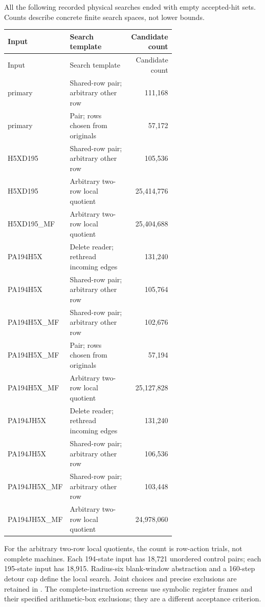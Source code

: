 All the following recorded physical searches ended with empty accepted-hit sets. Counts describe concrete finite search spaces, not lower bounds.
\begingroup\small\setlength{\tabcolsep}{3pt}
\begin{longtable}{>{\raggedright\arraybackslash}p{0.26\linewidth}>{\raggedright\arraybackslash}p{0.39\linewidth}r}
\toprule Input&Search template&Candidate count\\\midrule\endfirsthead
\toprule Input&Search template&Candidate count\\\midrule\endhead
\bottomrule\endfoot
primary&Shared-row pair; arbitrary other row&111,168\\[3pt]
primary&Pair; rows chosen from originals&57,172\\[3pt]
H5XD195&Shared-row pair; arbitrary other row&105,536\\[3pt]
H5XD195&Arbitrary two-row local quotient&25,414,776\\[3pt]
H5XD195\_MF&Arbitrary two-row local quotient&25,404,688\\[3pt]
PA194H5X&Delete reader; rethread incoming edges&131,240\\[3pt]
PA194H5X&Shared-row pair; arbitrary other row&105,764\\[3pt]
PA194H5X\_MF&Shared-row pair; arbitrary other row&102,676\\[3pt]
PA194H5X\_MF&Pair; rows chosen from originals&57,194\\[3pt]
PA194H5X\_MF&Arbitrary two-row local quotient&25,127,828\\[3pt]
PA194JH5X&Delete reader; rethread incoming edges&131,240\\[3pt]
PA194JH5X&Shared-row pair; arbitrary other row&106,536\\[3pt]
PA194JH5X\_MF&Shared-row pair; arbitrary other row&103,448\\[3pt]
PA194JH5X\_MF&Arbitrary two-row local quotient&24,978,060\\[3pt]
\end{longtable}\endgroup
For the arbitrary two-row local quotients, the count is row-action trials, not complete machines. Each 194-state input has 18,721 unordered control pairs; each 195-state input has 18,915. Radius-six blank-window abstraction and a 160-step detour cap define the local search. Joint choices and precise exclusions are retained in . The complete-instruction screens use symbolic register frames and their specified arithmetic-box exclusions; they are a different acceptance criterion.
